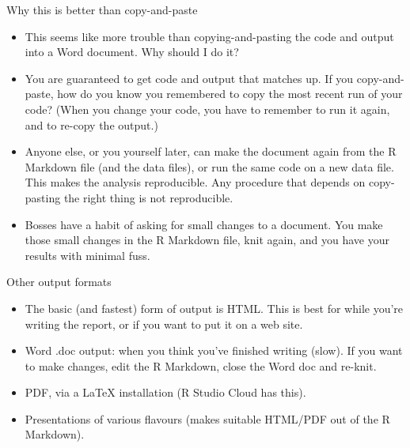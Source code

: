\documentclass[ignorenonframetext,]{beamer}
\providecommand{\tightlist}{%
  \setlength{\itemsep}{0pt}\setlength{\parskip}{0pt}}
\begin{document}
\begin{frame}{Why this is better than copy-and-paste}
\protect\hypertarget{why-this-is-better-than-copy-and-paste}{}

\begin{itemize}
\tightlist
\item
  This seems like more trouble than copying-and-pasting the code and
  output into a Word document. Why should I do it?
\item
  You are guaranteed to get code and output that matches up. If you
  copy-and-paste, how do you know you remembered to copy the most recent
  run of your code? (When you change your code, you have to remember to
  run it again, and to re-copy the output.)
\item
  Anyone else, or you yourself later, can make the document again from
  the R Markdown file (and the data files), or run the same code on a
  new data file. This makes the analysis reproducible. Any procedure
  that depends on copy-pasting the right thing is not reproducible.
\item
  Bosses have a habit of asking for small changes to a document. You
  make those small changes in the R Markdown file, knit again, and you
  have your results with minimal fuss.
\end{itemize}

\end{frame}

\begin{frame}{Other output formats}
\protect\hypertarget{other-output-formats}{}

\begin{itemize}
\tightlist
\item
  The basic (and fastest) form of output is HTML. This is best for while
  you're writing the report, or if you want to put it on a web site.
\item
  Word .doc output: when you think you've finished writing (slow). If
  you want to make changes, edit the R Markdown, close the Word doc and
  re-knit.
\item
  PDF, via a LaTeX installation (R Studio Cloud has this).
\item
  Presentations of various flavours (makes suitable HTML/PDF out of the
  R Markdown).
\end{itemize}

\end{frame}
\end{document}
